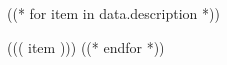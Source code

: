\begin{tightemize}
((* for item in data.description *))
\item ((( item )))
((* endfor *))
\end{tightemize}
\sectionsep